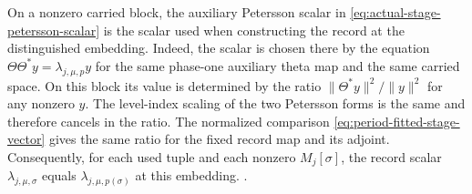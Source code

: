 On a nonzero carried block, the auxiliary Petersson scalar in
\eqref{eq:actual-stage-petersson-scalar} is the scalar used when
constructing the record at the distinguished embedding. Indeed,
the scalar is chosen there by the equation
\(\Theta\Theta^* y=\lambda_{j,\mu,p}y\) for the same phase-one
auxiliary theta map and the same carried space. On this block
its value is determined by the ratio
\(\|\Theta^*y\|^2/\|y\|^2\) for any nonzero \(y\). The
level-index scaling of the two Petersson forms is the same
and therefore cancels in the ratio. The normalized comparison
\eqref{eq:period-fitted-stage-vector} gives the same ratio for
the fixed record map and its adjoint. Consequently, for each
used tuple and each nonzero \(M_j[\sigma]\), the record scalar
\(\lambda_{j,\mu,\sigma}\) equals \(\lambda_{j,\mu,p(\sigma)}\)
at this embedding.
.

